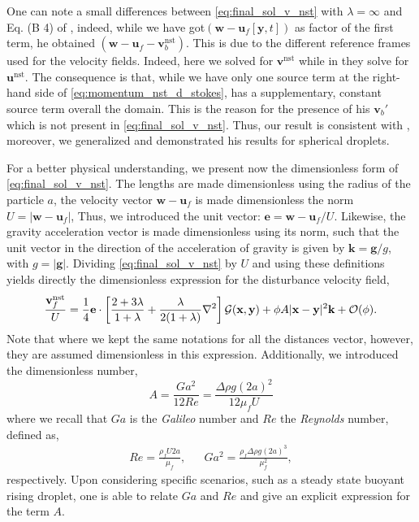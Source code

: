 One can note a small differences between \ref{eq:final_sol_v_nst} with $\lambda = \infty$ and Eq. (B 4) of  \citet[Appendix A]{zhang2021ensemble} , indeed, while we have got$(\textbf{w}- \textbf{u}_f[\textbf{y},t])$ as factor of the first term, he obtained $(\textbf{w}- \textbf{u}_f - \textbf{v}_b^\text{nst})$. 
This is due to the different reference frames used for the velocity fields.
Indeed, here we solved for $\textbf{v}^\text{nst}$ while in \citet{zhang2021ensemble} they solve for $\textbf{u}^\text{nst}$. 
The consequence is that, while we have only one source term at the right-hand side of \ref{eq:momentum_nst_d_stokes}, \citet{zhang2021ensemble} has a supplementary, constant source term overall the domain. 
This is the reason for the presence of his $\textbf{v}_b'$ which is not present in \ref{eq:final_sol_v_nst}. 
Thus, our result is consistent with \citet{zhang2021ensemble}, moreover, we generalized and demonstrated his results for spherical droplets. 


For a better physical understanding, we present now the dimensionless form of \ref{eq:final_sol_v_nst}. 
The lengths are made dimensionless using the radius of the particle $a$, the velocity vector $\textbf{w} - \textbf{u}_f$ is made dimensionless the norm $U = |\textbf{w} - \textbf{u}_f|$, 
Thus, we introduced the unit vector: $\textbf{e} = \textbf{w} - \textbf{u}_f/U$. 
Likewise, the gravity acceleration vector is made dimensionless using its norm, such that the unit vector in the direction of the acceleration of gravity is given by $\textbf{k} = \textbf{g} / g$, with $g = |\textbf{g}|$. 
Dividing \ref{eq:final_sol_v_nst} by $U$ and using these definitions yields directly the dimensionless expression for the disturbance velocity field, 
\begin{equation}
    \frac{\textbf{v}^\text{nst}_f}{U}
    =
    \frac{1}{4}\textbf{e}\cdot\left[
        \frac{2+3\lambda}{1+\lambda}
        +
        \frac{\lambda}{2(1+\lambda)}\grad^2 
    \right]\mathcal{G}(\textbf{x},\textbf{y})
    + \phi A |\textbf{x}-\textbf{y}|^2 \textbf{k}
    + \mathcal{O}(\phi). 
    \label{eq:v_nst_solution_adim}
\end{equation}
Note that where we kept the same notations for all the distances vector, however, they are assumed dimensionless in this expression. 
Additionally, we introduced the dimensionless number, 
\begin{equation}
    A = \frac{Ga^2}{12 Re}=\frac{\Delta \rho g (2a)^2}{12 \mu_f U}
    \label{eq:A_general}
\end{equation}
where we recall that $Ga$ is the \textit{Galileo} number and $Re$ the \textit{Reynolds} number, defined as,  
\begin{align*}
    Re= \frac{\rho_f U 2a}{\mu_f},
    &&
    Ga^2 = \frac{\rho_f \Delta\rho g (2a)^3}{\mu_f^2},
\end{align*}
respectively. 
Upon considering specific scenarios, such as a steady state buoyant rising droplet, one is able to relate $Ga$ and $Re$ and give an explicit expression for the term $A$.
 



